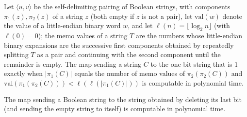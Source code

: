 \begin{theorem}
\label{Complexity.ladner_ctxGuard_FP}
\leanok
{}
Let $\langle u,v\rangle$ be the self-delimiting pairing of Boolean strings, with components $\pi_1(z),\pi_2(z)$ of a string $z$ (both empty if $z$ is not a pair), let $\mathrm{val}(w)$ denote the value of a little-endian binary word $w$, and let $\ell(n)=\lfloor\log_2 n\rfloor$ (with $\ell(0)=0$); the memo values of a string $T$ are the numbers whose little-endian binary expansions are the successive first components obtained by repeatedly splitting $T$ as a pair and continuing with the second component until the remainder is empty. The map sending a string $C$ to the one-bit string that
is $1$ exactly when $|\pi_1(C)|$ equals the number of memo values of $\pi_2(\pi_2(C))$ and
$\mathrm{val}(\pi_1(\pi_2(C)))<\ell(\ell(|\pi_1(C)|))$ is computable in polynomial time.
\end{theorem}

\begin{theorem}
\label{Complexity.ladner_dropLast_FP}
\leanok
{}
The map sending a Boolean string to the string obtained by deleting its last bit (and sending
the empty string to itself) is computable in polynomial time.
\end{theorem}

